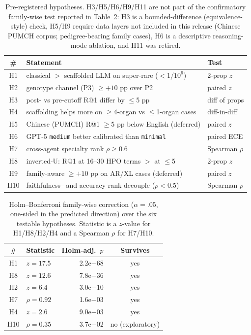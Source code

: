 \documentclass[letterpaper]{article} %
\begin{document}
\begin{table}[t]
\centering
\scriptsize
\setlength{\tabcolsep}{4pt}
\caption{Pre-registered hypotheses. H3/H5/H6/H9/H11 are not part of the
confirmatory family-wise test reported in Table~\ref{tab:holm}: H3 is a
bounded-difference (equivalence-style) check, H5/H9 require data layers not
included in this release (Chinese PUMCH corpus; pedigree-bearing family cases), H6 is a
descriptive reasoning-mode ablation, and H11 was retired.}
\label{tab:hyp}
\begin{tabular}{@{}cll@{}}
\toprule
\# & Statement & Test \\
\midrule
H1 & classical $>$ scaffolded LLM on super-rare ($<$1/$10^6$) & 2-prop $z$ \\
H2 & genotype channel (P3) $\geq +10$ pp over P2 & paired $z$ \\
H3 & post- vs pre-cutoff R@1 differ by $\leq$5 pp & diff of props \\
H4 & scaffolding helps more on $\geq$4-organ vs $\leq$1-organ cases & diff-in-diff \\
H5 & Chinese (PUMCH) R@1 $\geq$5 pp below English (deferred) & paired $z$ \\
H6 & GPT-5 \texttt{medium} better calibrated than \texttt{minimal} & paired ECE \\
H7 & cross-agent specialty rank $\rho \geq 0.6$ & Spearman $\rho$ \\
H8 & inverted-U: R@1 at 16--30 HPO terms $>$ at $\leq$5 & 2-prop $z$ \\
H9 & family-aware $\geq +10$ pp on AR/XL cases (deferred) & paired $z$ \\
H10 & faithfulness-- and accuracy-rank decouple ($\rho<0.5$) & Spearman $\rho$ \\
\bottomrule
\end{tabular}
\end{table}

\begin{table}[h]
\centering
\scriptsize
\setlength{\tabcolsep}{4pt}
\caption{Holm--Bonferroni family-wise correction ($\alpha{=}.05$, one-sided in
the predicted direction) over the six testable hypotheses. Statistic is a
$z$-value for H1/H8/H2/H4 and a Spearman $\rho$ for H7/H10.}
\label{tab:holm}
\begin{tabular}{@{}clrc@{}}
\toprule
\# & Statistic & Holm-adj.\ $p$ & Survives \\
\midrule
H1 & $z=17.5$ & 2.2e$-$68 & yes \\
H8 & $z=12.6$ & 7.8e$-$36 & yes \\
H2 & $z=6.4$ & 3.0e$-$10 & yes \\
H7 & $\rho=0.92$ & 1.6e$-$03 & yes \\
H4 & $z=2.6$ & 9.0e$-$03 & yes \\
H10 & $\rho=0.35$ & 3.7e$-$02 & no (exploratory) \\
\bottomrule
\end{tabular}
\end{table}
\end{document}
